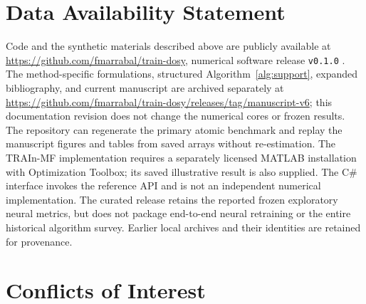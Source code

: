 \section*{Data Availability Statement}
Code and the synthetic materials described above are publicly available at \url{https://github.com/fmarrabal/train-dosy}, numerical software release \texttt{v0.1.0} \cite{software}. The method-specific formulations, structured Algorithm~\ref{alg:support}, expanded bibliography, and current manuscript are archived separately at \url{https://github.com/fmarrabal/train-dosy/releases/tag/manuscript-v6}; this documentation revision does not change the numerical cores or frozen results. The repository can regenerate the primary atomic benchmark and replay the manuscript figures and tables from saved arrays without re-estimation. The TRAIn-MF implementation requires a separately licensed MATLAB installation with Optimization Toolbox; its saved illustrative result is also supplied. The C\# interface invokes the reference API and is not an independent numerical implementation. The curated release retains the reported frozen exploratory neural metrics, but does not package end-to-end neural retraining or the entire historical algorithm survey. Earlier local archives and their identities are retained for provenance.

\section*{Conflicts of Interest}
\par

